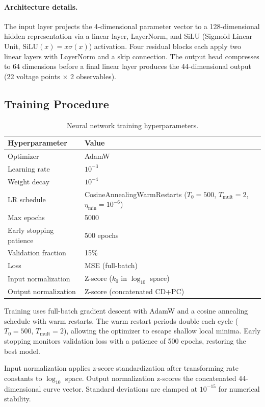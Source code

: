 \documentclass[11pt,a4paper]{article}
\begin{document}
\paragraph{Architecture details.}
The input layer projects the 4-dimensional parameter vector to a
128-dimensional hidden representation via a linear layer, LayerNorm, and
SiLU (Sigmoid Linear Unit, $\text{SiLU}(x) = x\sigma(x)$) activation.
Four residual blocks each apply two linear layers with LayerNorm and a
skip connection. The output head compresses to 64 dimensions before
a final linear layer produces the 44-dimensional output (22 voltage
points $\times$ 2 observables).

\subsection{Training Procedure}\label{sec:training}

\begin{table}[H]
\centering
\caption{Neural network training hyperparameters.}
\label{tab:nn_hyper}
\begin{tabular}{ll}
\toprule
Hyperparameter & Value \\
\midrule
Optimizer & AdamW \\
Learning rate & $10^{-3}$ \\
Weight decay & $10^{-4}$ \\
LR schedule & CosineAnnealingWarmRestarts ($T_0=500$, $T_{\mathrm{mult}}=2$, $\eta_{\min}=10^{-6}$) \\
Max epochs & 5000 \\
Early stopping patience & 500 epochs \\
Validation fraction & 15\% \\
Loss & MSE (full-batch) \\
Input normalization & Z-score ($k_0$ in $\log_{10}$ space) \\
Output normalization & Z-score (concatenated CD+PC) \\
\bottomrule
\end{tabular}
\end{table}

Training uses full-batch gradient descent with AdamW and a cosine
annealing schedule with warm restarts. The warm restart periods double
each cycle ($T_0 = 500$, $T_{\mathrm{mult}} = 2$), allowing the
optimizer to escape shallow local minima. Early stopping monitors
validation loss with a patience of 500 epochs, restoring the best model.

Input normalization applies z-score standardization after transforming
rate constants to $\log_{10}$ space. Output normalization z-scores the
concatenated 44-dimensional curve vector. Standard deviations are clamped
at $10^{-15}$ for numerical stability.
\end{document}

